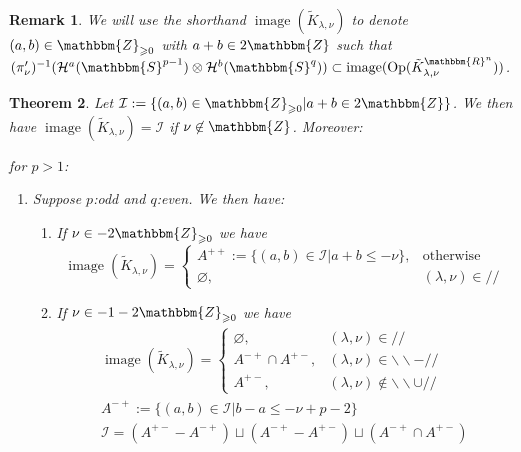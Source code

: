 \documentclass[12pt]{msjproc} %
\newcommand{\assign}{:=}
\newcommand{\nin}{\not\in}
\newcommand{\tmop}[1]{\ensuremath{\operatorname{#1}}}
\newtheorem{theorem}{Theorem}
\newtheorem{remark}[theorem]{Remark}
\theoremstyle{definition}
\theoremstyle{exampstyle} \newtheorem{examp}[theorem]{Theorem}
\begin{document}
\begin{versiona}
\begin{remark}
  We will use the shorthand $\tmop{image} (\tilde{K}_{\lambda, \nu})$ to
  denote $(a, b) \in \mathbbm{Z}_{\geqslant 0}$ with $a + b \in 2\mathbbm{Z}$
  such that $(\pi_{\nu}')^{- 1} (\mathcal{H}^a (\mathbbm{S}^{p - 1}) \otimes
  \mathcal{H}^b (\mathbbm{S}^q)) \subset \tmop{image} (\tmop{Op}
  (\tilde{K}_{\lambda, \nu}^{\mathbbm{R}^n}))$.
\end{remark}

\begin{theorem}
  \label{images:prop-main}Let $\mathcal{I} \assign \{ (a, b) \in
  \mathbbm{Z}_{\geqslant 0} | a + b \in 2\mathbbm{Z} \}$. We then have
  $\tmop{image} (\tilde{K}_{\lambda, \nu}) =\mathcal{I}$ if $\nu \nin
  \mathbbm{Z}$. Moreover:
  
  for $p > 1$:
\newcommand{\noplus}{}
  \begin{enumerate}
    \item Suppose $p$:odd and $q$:even. We then have:
    \begin{enumerate}
      \item If $\nu \in - 2\mathbbm{Z}_{\geqslant 0}$ we have
      \[ \tmop{image} (\tilde{K}_{\lambda, \nu}) = \left\{ \begin{array}{ll}
           A^{+ +} \assign \{ (a, b) \in \mathcal{I} | a + b \leqslant - \nu
           \}, & \tmop{otherwise}\\
           \varnothing, & (\lambda, \nu) \in / /
         \end{array} \right. \]
      \item If $\nu \in - 1 - 2\mathbbm{Z}_{\geqslant 0}$ we have
      \begin{eqnarray}
        & \tmop{image} (\tilde{K}_{\lambda, \nu}) = \left\{ \begin{array}{ll}
          \varnothing, & (\lambda, \nu) \in / /\\
          A^{- +} \cap A^{\noplus + -}, & (\lambda, \nu) \in
          \backslash\backslash - / /\\
          A^{+ -}, & (\lambda, \nu) \nin \backslash\backslash \cup / /
        \end{array} \right. &  \nonumber\\
        & A^{- +} \assign \{ (a, b) \in \mathcal{I} | b - a \leqslant - \nu +
        p - 2 \} &  \nonumber\\
        & \mathcal{I}= (A^{\noplus \noplus + -} - A^{- +}) \sqcup (A^{- +} -
        A^{+ -}) \sqcup (A^{- +} \cap A^{\noplus + -}) &  \nonumber\\

\end{eqnarray}
\end{enumerate}
\end{enumerate}
\end{theorem}
\end{versiona}
\end{document}

